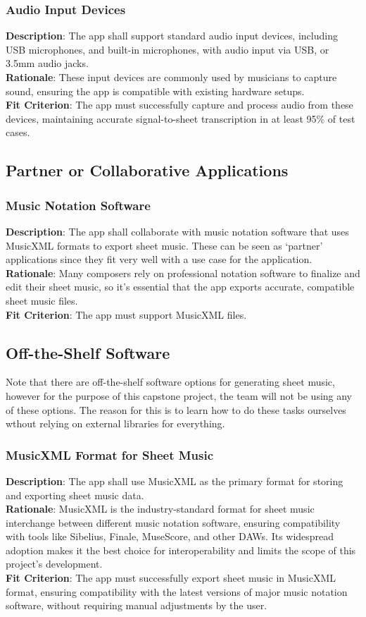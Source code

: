 \documentclass[12pt]{article}
\begin{document}
\subsubsection*{Audio Input Devices}
\textbf{Description}: The app shall support standard audio input devices, including USB microphones, and built-in microphones, with audio input via USB, or 3.5mm audio jacks.\\
\textbf{Rationale}: These input devices are commonly used by musicians to capture sound, ensuring the app is compatible with existing hardware setups.\\
\textbf{Fit Criterion}: The app must successfully capture and process audio from these devices, maintaining accurate signal-to-sheet transcription in at least 95\% of test cases.

\subsection{Partner or Collaborative Applications}
\subsubsection*{Music Notation Software}
\textbf{Description}: The app shall collaborate with music notation software that uses MusicXML formats to export sheet music. These can be seen as ‘partner’ applications since they fit very well with a use case for the application.\\
\textbf{Rationale}: Many composers rely on professional notation software to finalize and edit their sheet music, so it’s essential that the app exports accurate, compatible sheet music files.\\
\textbf{Fit Criterion}: The app must support MusicXML files.

\subsection{Off-the-Shelf Software}
Note that there are off-the-shelf software options for generating sheet music, however for the purpose of this capstone project, the team will not be using any of these options. 
The reason for this is to learn how to do these tasks ourselves wthout relying on external libraries for everything.
\subsubsection*{MusicXML Format for Sheet Music}
\textbf{Description}: The app shall use MusicXML as the primary format for storing and exporting sheet music data.\\
\textbf{Rationale}: MusicXML is the industry-standard format for sheet music interchange between different music notation software, ensuring compatibility with tools like Sibelius, Finale, MuseScore, and other DAWs. Its widespread adoption makes it the best choice for interoperability and limits the scope of this project's development.\\
\textbf{Fit Criterion}: The app must successfully export sheet music in MusicXML format, ensuring compatibility with the latest versions of major music notation software, without requiring manual adjustments by the user.
\end{document}
